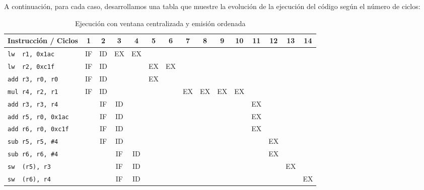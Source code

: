 \begin{ejercicio}
\begin{figure}[H]
\end{figure}

A continuación, para cada caso, desarrollamos una tabla que muestre la evolución de la ejecución del código según el número de ciclos:

\begin{table}[H]
\centering
\scriptsize
\begin{tabular}{|l|c|c|c|c|c|c|c|c|c|c|c|c|c|c|}
    \hline
    Instrucción / Ciclos & 1 & 2 & 3 & 4 & 5 & 6 & 7 & 8 & 9 & 10 & 11 & 12  & 13 & 14 \\
    \hline
    \verb|lw  r1, 0x1ac|     & IF & ID & EX & EX & & & & & & & & & & \\
    \hline        
    \verb|lw  r2, 0xc1f|     & IF & ID & & & EX & EX & & & & & & & & \\
    \hline           
    \verb|add r3, r0, r0|    & IF & ID & & & EX & & & & & & & & & \\
    \hline                        
    \verb|mul r4, r2, r1|    & IF & ID & & & & & EX & EX & EX & EX & & & & \\
    \hline            
    \verb|add r3, r3, r4|    & & IF & ID & & & & & & & & EX & & & \\
    \hline            
    \verb|add r5, r0, 0x1ac| & & IF & ID & & & & & & & & EX & & & \\
    \hline            
    \verb|add r6, r0, 0xc1f| & & IF & ID & & & & & & & & EX & & & \\
    \hline        
    \verb|sub r5, r5, #4|    & & IF & ID & & & & & & & & & EX & & \\
    \hline
    \verb|sub r6, r6, #4|    & & & IF & ID & & & & & & & & EX & & \\
    \hline
    \verb|sw  (r5), r3|      & & & IF & ID & & & & & & & & & EX & \\
    \hline          
    \verb|sw  (r6), r4|      & & & IF & ID & & & & & & & & & & EX \\
    \hline
\end{tabular}
\caption{Ejecución con ventana centralizada y emisión ordenada}
\end{table}


\end{ejercicio}
